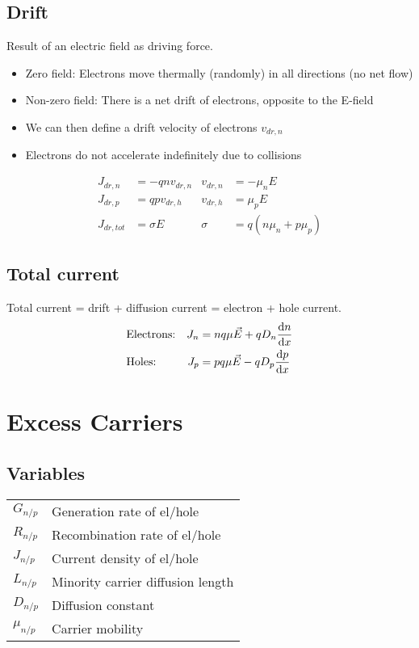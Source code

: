 \documentclass[a4paper, fontsize=8pt, landscape, DIV=1]{scrartcl}
\begin{document}
\begin{multicols*}{4}
  \subsection{Drift}
    Result of an electric field as driving force.
    \begin{itemize}
      \item Zero field: Electrons move thermally (randomly) in all directions (no net flow)
      \item Non-zero field: There is a net drift of electrons, opposite to the E-field
      \item We can then define a drift velocity of electrons $v_{dr,n}$
      \item Electrons do not accelerate indefinitely due to collisions
    \end{itemize}
    \begin{align*}
      J_{dr,n} &= -qnv_{dr,n} & v_{dr,n} &= -\mu_nE \\
      J_{dr,p} &= qpv_{dr,h} & v_{dr,h} &= \mu_pE \\
      J_{dr,tot} &= \sigma E & \sigma &= q(n\mu_n + p\mu_p)
    \end{align*}
  
  \subsection{Total current}
    Total current = drift + diffusion current = electron + hole current.
    \begin{align*}
      &\text{Electrons:} & J_n &= nq\mu\vec{E}+qD_n\frac{\mathrm{d}n}{\mathrm{d}x} \\
      &\text{Holes:} & J_p &= pq\mu\vec{E}-qD_p\frac{\mathrm{d}p}{\mathrm{d}x} \\
    \end{align*}

  \section{Excess Carriers}
  \subsection{Variables}
    \begin{tabular}[h]{l l}
      $G_{n/p}$   & Generation rate of el/hole \\
      $R_{n/p}$   & Recombination rate of el/hole \\
      $J_{n/p}$   & Current density of el/hole \\
      $L_{n/p}$   & Minority carrier diffusion length \\
      $D_{n/p}$   & Diffusion constant \\
      $\mu_{n/p}$ & Carrier mobility \\
    \end{tabular}


\end{multicols*}
\end{document}
